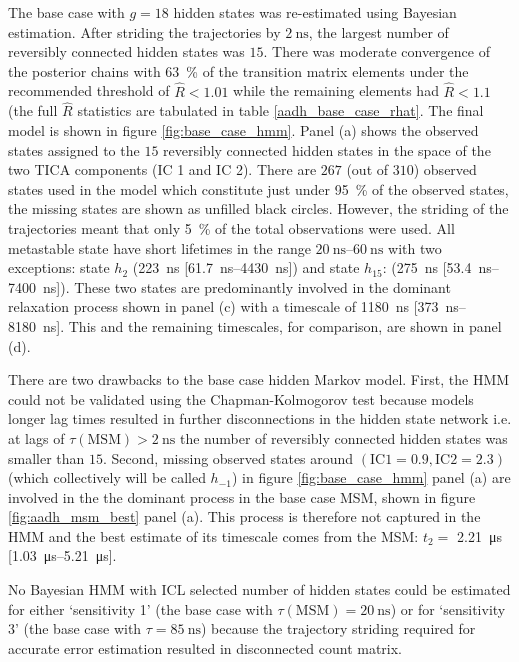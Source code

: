 The base case with $g=18$ hidden states was re-estimated using Bayesian estimation. After striding the trajectories by $\SI{2}{\nano\second}$, the largest number of reversibly connected hidden states was $15$. There was moderate convergence of the posterior chains with \SI{63}{\percent} of the transition matrix elements under the recommended threshold of $\hat{R}<1.01$ while the remaining elements had $\hat{R}<1.1$ (the full $\hat{R}$ statistics  are tabulated in table \ref{aadh_base_case_rhat}.  The final model is shown in figure \ref{fig:base_case_hmm}. Panel (a) shows the observed states assigned to the $15$ reversibly connected hidden states in the space of the two TICA components (IC 1 and IC 2). There are $267$ (out of $310$) observed states  used in the model which constitute just under \SI{95}{\percent} of the observed states, the missing states are shown as unfilled black circles. However, the striding of the trajectories meant that only \SI{5}{\percent} of the total observations were used. All metastable state have short lifetimes in the range $\SIrange{20}{60}{\nano\second}$ with two exceptions: state $h_2$ (\SI{223}{\nano\second} [\SIrange[range-phrase=-]{61.7}{4430}{\nano\second}]) and state $h_{15}$: (\SI{275}{\nano\second} [\SIrange[range-phrase=-]{53.4}{7400}{\nano\second}]). These two states are predominantly involved in the dominant relaxation process shown in panel (c) with a timescale of \SI{1180}{\nano\second} [\SIrange[range-phrase=-]{373}{8180}{\nano\second}]. This and the remaining timescales,  for comparison,  are shown in panel (d). 

There are two drawbacks to the base case hidden Markov model. First, the HMM could not be validated using the Chapman-Kolmogorov test because models longer lag times resulted in further disconnections in the hidden state network i.e. at lags of $\tau(\mathrm{MSM})> \SI{2}{\nano\second}$ the number of reversibly connected hidden states was smaller than $15$. Second, missing observed states around $(\mathrm{IC 1}=0.9, \mathrm{IC 2}=2.3)$ (which collectively will be called $h_{-1}$) in figure \ref{fig:base_case_hmm} panel (a) are involved in the the dominant process in the  base case MSM, shown in figure \ref{fig:aadh_msm_best} panel (a). This process is therefore not captured in the HMM and the best estimate of its timescale comes from the MSM: $t_2 =$ \SI{2.21}{\micro\second} [\SIrange[range-phrase=-]{1.03}{5.21}{\micro\second}].

No Bayesian HMM with ICL selected number of hidden states could be estimated for either `sensitivity 1' (the base case with $\tau(\mathrm{MSM})=\SI{20}{\nano\second}$) or for `sensitivity 3' (the  base case with $\tau = \SI{85}{\nano\second}$) because the trajectory striding required for accurate error estimation resulted in disconnected count matrix.  

